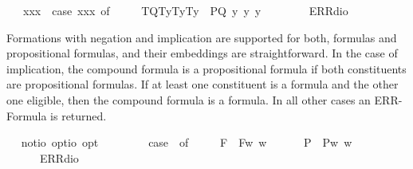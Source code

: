 \begin{isabellebody}
\ \ \ {\isachardoublequoteopen}{\isasymlparr}{\isasymPhi}{\isacharcomma}x{}{\isacharcomma}x{}{\isacharcomma}x{}{\isasymrparr}\ {\isasymequiv}\ case\ {\isacharparenleft}{\isasymPhi}{\isacharcomma}x{}{\isacharcomma}x{}{\isacharcomma}x{}{\isacharparenright}\ of\ \isanewline
\ \ \ \ {\isacharparenleft}T{\isacharparenleft}Q{\isacharparenright}{\isacharcomma}T{\isacharparenleft}y{}{\isacharparenright}{\isacharcomma}T{\isacharparenleft}y{}{\isacharparenright}{\isacharcomma}T{\isacharparenleft}y{}{\isacharparenright}{\isacharparenright}\ {\isasymRightarrow}\ P{\isacharparenleft}{\isacharparenleft}Q\ y{}\ y{}\ y{}{\isacharparenright}{\isacharparenright}\ {\isacharbar}\ \isanewline
\ \ \ \ {\isacharunderscore}\ {\isasymRightarrow}\ ERR{\isacharparenleft}dio{\isacharparenright}{\isachardoublequoteclose}%
\begin{isamarkuptext}%
Formations with negation and implication are supported for both, formulas and propositional
  formulas, and their embeddings are straightforward. In the case of implication, the compound formula
  is a propositional formula if both constituents are propositional formulas. If at least one constituent 
  is a formula and the other one eligible, then the compound formula is a formula. In all other
  cases an ERR-Formula is returned.%
\end{isamarkuptext}\isamarkuptrue%
\ \isamarkupfalse%
\ not{\isacharcolon}{\isacharcolon}{\isachardoublequoteopen}io\ opt{\isasymRightarrow}io\ opt{\isachardoublequoteclose}\ {\isacharparenleft}{\isachardoublequoteopen}\isactrlbold {\isasymnot}\ {\isacharunderscore}{\isachardoublequoteclose}\ {\isacharbrackleft}{}{}{\isacharbrackright}\ {}{}{\isacharparenright}\ \ {\isachardoublequoteopen}\isactrlbold {\isasymnot}\ {\isasymphi}\ {\isasymequiv}\ case\ {\isasymphi}\ of\ \isanewline
\ \ \ \ F{\isacharparenleft}{\isasympsi}{\isacharparenright}\ {\isasymRightarrow}\ F{\isacharparenleft}{\isasymlambda}w{\isachardot}{\isasymnot}{\isacharparenleft}{\isasympsi}\ w{\isacharparenright}{\isacharparenright}\ {\isacharbar}\ \isanewline
\ \ \ \ P{\isacharparenleft}{\isasympsi}{\isacharparenright}\ {\isasymRightarrow}\ P{\isacharparenleft}{\isasymlambda}w{\isachardot}{\isasymnot}{\isacharparenleft}{\isasympsi}\ w{\isacharparenright}{\isacharparenright}\ {\isacharbar}\ \isanewline
\ \ \ \ {\isacharunderscore}\ {\isasymRightarrow}\ ERR{\isacharparenleft}dio{\isacharparenright}{\isachardoublequoteclose}\ \ \isanewline

\end{isabellebody}
